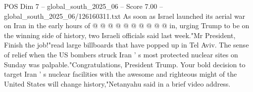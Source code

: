 \begin{textsample}{POS Dim 7 – global\_south\_2025\_06 – Score 7.00 – global\_south\_2025\_06/126160311.txt}
As soon as Israel launched its aerial war on Iran in the early hours of @ @ @ @ @ @ @ @ @ @ in, urging Trump to be on the winning side of history, two Israeli officials said last week."Mr President, Finish the job!"read large billboards that have popped up in Tel Aviv.
The sense of relief when the US bombers struck Iran ' s most protected nuclear sites on Sunday was palpable."Congratulations, President Trump.
Your bold decision to target Iran ' s nuclear facilities with the awesome and righteous might of the United States will change history,"Netanyahu said in a brief video address.

\end{textsample}
